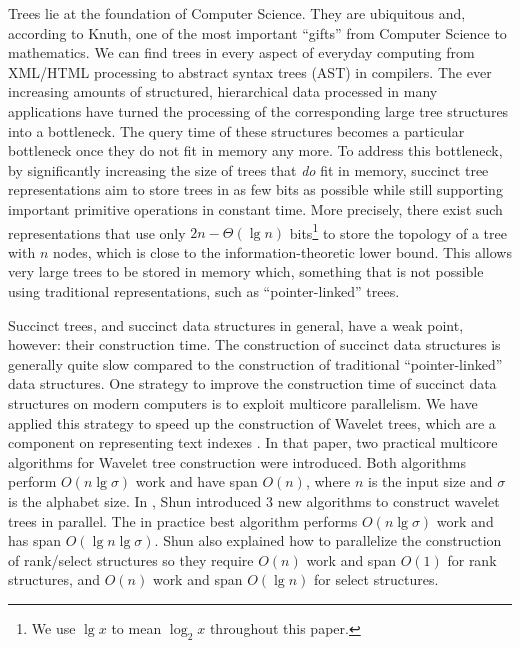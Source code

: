 Trees lie at the foundation of Computer Science. They are ubiquitous and,
according to Knuth, one of the most important ``gifts'' from Computer Science to
mathematics. We can find trees in every
aspect of everyday computing from XML/HTML processing to abstract syntax trees (AST) in compilers.
The ever increasing amounts of structured, hierarchical data processed in
many applications have turned the processing of the corresponding large tree
structures into a bottleneck.
The query time of these structures becomes a particular bottleneck once they
do not fit in memory any more.
To address this bottleneck, by significantly increasing the size of trees
that \emph{do} fit in memory, succinct tree representations aim to store trees
in as few bits as possible while still supporting important primitive operations
in constant time.
More precisely, there exist such representations that use only
$2n - \Theta(\lg n)$ bits\footnote{We use $\lg x$ to mean
  $\log_{2}x$ throughout this paper.} to store the topology of a tree with $n$
nodes, which is close to the information-theoretic lower bound.
This allows very large trees to be stored in memory which, something that is not
possible using traditional representations, such as ``pointer-linked'' trees.

Succinct trees, and succinct data structures in general, have a weak point,
however: their construction time. The construction of succinct
data structures is generally quite slow compared to the construction of
traditional ``pointer-linked'' data structures.
One strategy to improve the construction time of succinct data structures
on modern computers is to exploit multicore parallelism.
We have applied this strategy to speed up the construction of Wavelet trees,
which are a component on representing text indexes \cite{Fuentes2014}.
In that paper, two practical multicore algorithms
for Wavelet tree construction were introduced. Both algorithms perform
$O(n\lg \sigma)$ work and have span $O(n)$, where $n$
is the input size and $\sigma$ is the alphabet size. In
\cite{DBLP:journals/corr/Shun14}, Shun introduced 3 new algorithms to
construct wavelet trees in parallel. The in practice best algorithm
performs $O(n\lg \sigma)$ work and has span $O(\lg n\lg \sigma)$.
Shun also explained how to parallelize the construction of
rank/select structures so they require $O(n)$ work and span $O(1)$ for rank
structures, and $O(n)$ work and span $O(\lg n)$ for select structures.

